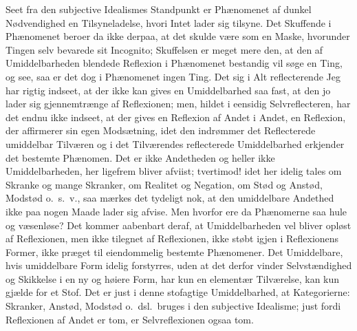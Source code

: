 \documentclass[12pt]{book}
\newcommand{\opage}[1]{\marginnote{\footnotesize\textit{[#1]}}}
\begin{document}
Seet fra den subjective Idealismes Standpunkt er Phænomenet af dunkel Nødvendighed en
Tilsyneladelse, hvori Intet lader sig tilsyne. Det Skuffende i Phænomenet beroer da
ikke derpaa, at det skulde være som en Maske, hvorunder Tingen selv bevarede sit
Incognito; Skuffelsen er meget mere den, at den af Umiddelbarheden blendede Reflexion
i Phænomenet bestandig vil søge en Ting, og see, saa er det dog i Phænomenet ingen
Ting. Det sig i Alt reflecterende Jeg har rigtig indseet, at der ikke kan gives en
Umiddelbarhed saa fast, at den jo lader sig gjennemtrænge af Reflexionen; men, hildet
i eensidig Selvreflecteren, har det endnu ikke indseet, at der gives en Reflexion af
Andet i Andet, en Reflexion, der affirmerer sin egen Modsætning, idet den indrømmer
det Reflecterede umiddelbar Tilværen og i det Tilværendes reflecterede Umiddelbarhed
erkjender det bestemte Phænomen. Det
\opage{83} er ikke Andetheden og heller ikke Umiddelbarheden, her ligefrem bliver afviist;
tvertimod! idet her idelig tales om Skranke og mange Skranker, om Realitet og
Negation, om Stød og Anstød, Modstød o.\ s.\ v., saa mærkes det tydeligt nok, at den
umiddelbare Andethed ikke paa nogen Maade lader sig afvise. Men hvorfor ere da
Phænomerne saa hule og væsenløse? Det kommer aabenbart deraf, at Umiddelbarheden vel
bliver opløst af Reflexionen, men ikke tilegnet af Reflexionen, ikke støbt igjen i
Reflexionens Former, ikke præget til eiendommelig bestemte Phænomener. Det
Umiddelbare, hvis umiddelbare Form idelig forstyrres, uden at det derfor vinder
Selvstændighed og Skikkelse i en ny og høiere Form, har kun en elementær Tilværelse,
kan kun gjælde for et Stof. Det er just i denne stofagtige Umiddelbarhed, at
Kategorierne: Skranker, Anstød, Modstød o.\ dsl.\ bruges i den subjective Idealisme;
just fordi Reflexionen af Andet er tom, er Selvreflexionen ogsaa tom.
\end{document}
